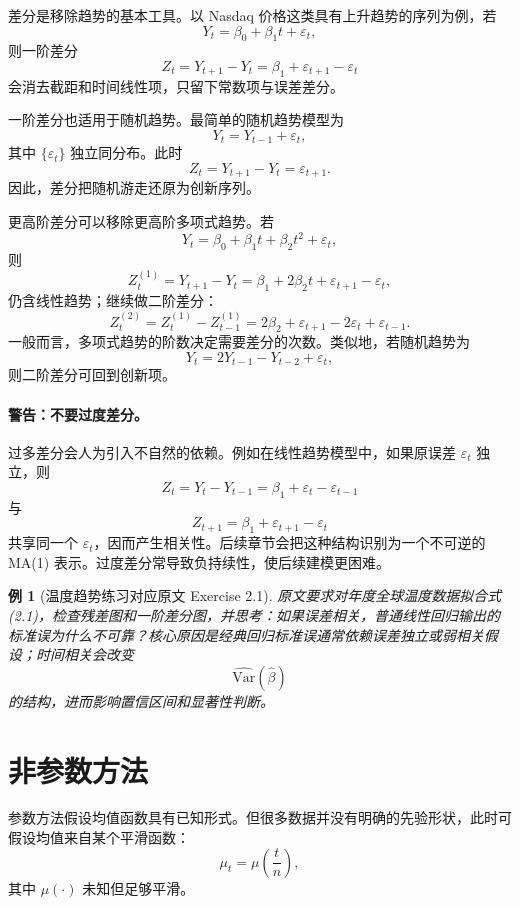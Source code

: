 \documentclass[11pt,a4paper,openany]{ctexbook}
\newtheorem{example}{例}[section]
\begin{document}
差分是移除趋势的基本工具。以 Nasdaq 价格这类具有上升趋势的序列为例，若
\[
  Y_t=\beta_0+\beta_1t+\varepsilon_t,
\]
则一阶差分
\[
  Z_t=Y_{t+1}-Y_t=\beta_1+\varepsilon_{t+1}-\varepsilon_t
\]
会消去截距和时间线性项，只留下常数项与误差差分。

一阶差分也适用于随机趋势。最简单的随机趋势模型为
\begin{equation}
  Y_t=Y_{t-1}+\varepsilon_t, \tag{2.7}
\end{equation}
其中 \(\{\varepsilon_t\}\) 独立同分布。此时
\[
  Z_t=Y_{t+1}-Y_t=\varepsilon_{t+1}.
\]
因此，差分把随机游走还原为创新序列。

更高阶差分可以移除更高阶多项式趋势。若
\[
  Y_t=\beta_0+\beta_1t+\beta_2t^2+\varepsilon_t,
\]
则
\[
  Z_t^{(1)}=Y_{t+1}-Y_t=\beta_1+2\beta_2t+\varepsilon_{t+1}-\varepsilon_t,
\]
仍含线性趋势；继续做二阶差分：
\[
  Z_t^{(2)}=Z_t^{(1)}-Z_{t-1}^{(1)}
  =2\beta_2+\varepsilon_{t+1}-2\varepsilon_t+\varepsilon_{t-1}.
\]
一般而言，多项式趋势的阶数决定需要差分的次数。类似地，若随机趋势为
\[
  Y_t=2Y_{t-1}-Y_{t-2}+\varepsilon_t,
\]
则二阶差分可回到创新项。

\paragraph{警告：不要过度差分。}
过多差分会人为引入不自然的依赖。例如在线性趋势模型中，如果原误差 \(\varepsilon_t\) 独立，则
\[
  Z_t=Y_t-Y_{t-1}=\beta_1+\varepsilon_t-\varepsilon_{t-1}
\]
与
\[
  Z_{t+1}=\beta_1+\varepsilon_{t+1}-\varepsilon_t
\]
共享同一个 \(\varepsilon_t\)，因而产生相关性。后续章节会把这种结构识别为一个不可逆的 MA(1) 表示。过度差分常导致负持续性，使后续建模更困难。

\begin{example}[温度趋势练习对应原文 Exercise 2.1]
原文要求对年度全球温度数据拟合式 (2.1)，检查残差图和一阶差分图，并思考：如果误差相关，普通线性回归输出的标准误为什么不可靠？核心原因是经典回归标准误通常依赖误差独立或弱相关假设；时间相关会改变
\[
  \widehat{\mathrm{Var}}(\hat{\beta})
\]
的结构，进而影响置信区间和显著性判断。
\end{example}

\section{非参数方法}

参数方法假设均值函数具有已知形式。但很多数据并没有明确的先验形状，此时可假设均值来自某个平滑函数：
\[
  \mu_t=\mu\left(\frac{t}{n}\right),
\]
其中 \(\mu(\cdot)\) 未知但足够平滑。
\end{document}
